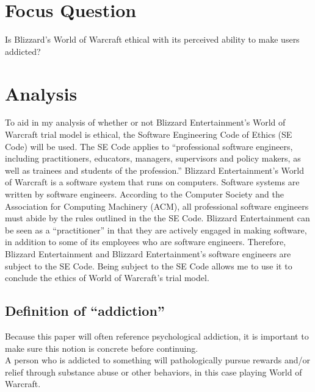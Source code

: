 \documentclass[11pt]{article}
\begin{document}
\begin{multicols}{2}
\setcounter{page}{1}

\section{Focus Question}
Is Blizzard's World of Warcraft ethical with its perceived ability to make users addicted?


\section{Analysis}

To aid in my analysis of whether or not Blizzard Entertainment's World of Warcraft trial model is ethical, the Software Engineering Code of Ethics (SE Code) will be used. The SE Code applies to ``professional software engineers, including practitioners, educators, managers, supervisors and policy makers, as well as trainees and students of the profession.'' \cite{SECode} Blizzard Entertainment's World of Warcraft is a software system that runs on computers. \cite{WoWSystemReqs} Software systems are written by software engineers. \cite{ACMApprovesSECode} According to the Computer Society and the Association for Computing Machinery (ACM), all professional software engineers must abide by the rules outlined in the the SE Code. \cite{ACMApprovesSECode}\cite{SECode} Blizzard Entertainment can be seen as a ``practitioner'' in that they are actively engaged in making software, in addition to some of its employees who are software engineers. Therefore, Blizzard Entertainment and Blizzard Entertainment's software engineers are subject to the SE Code. \cite{SECode} Being subject to the SE Code allows me to use it to conclude the ethics of World of Warcraft's trial model.

\subsection{Definition of ``addiction''}
Because this paper will often reference psychological addiction, it is important to make sure this notion is concrete before continuing.\\
A person who is addicted to something will pathologically pursue rewards and/or relief through substance abuse or other behaviors, in this case playing World of Warcraft. \cite{DefinitionOfAddiction}


\end{multicols}
\end{document}
